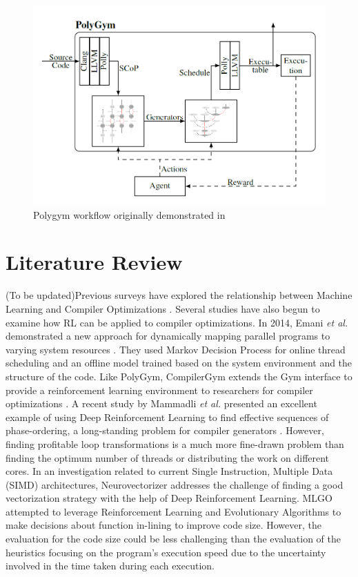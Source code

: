 \documentclass[logo,msc]{infthesis}           %
\begin{document}
\begin{figure}[htbp]
  \centering
  \includegraphics[width=\textwidth]{Images/PolyGym.png}    
  \caption{Polygym workflow originally demonstrated in \cite{P1}}
  \label{fig:polygym}
\end{figure}

\section{Literature Review}

(To be updated)Previous surveys have explored the relationship between Machine Learning and Compiler Optimizations \cite{8357388}\cite{9232934}. Several studies have also begun to examine how RL can be applied to compiler optimizations. In 2014, Emani \textit{et al.} demonstrated a new approach for dynamically mapping parallel programs to varying system resources \cite{10.1007}. They used Markov Decision Process for online thread scheduling and an offline model trained based on the system environment and the structure of the code. Like PolyGym, CompilerGym extends the Gym interface to provide a reinforcement learning environment to researchers for compiler optimizations \cite{CompilerGym}. A recent study by Mammadli \textit{et al.} presented an excellent example of using Deep Reinforcement Learning to find effective sequences of phase-ordering, a long-standing problem for compiler generators \cite{static.neural}. However, finding profitable loop transformations is a much more fine-drawn problem than finding the optimum number of threads or distributing the work on different cores. In an investigation related to current Single Instruction, Multiple Data (SIMD) architectures, Neurovectorizer \cite{NeuroVectorizer} addresses the challenge of finding a good vectorization strategy with the help of Deep Reinforcement Learning. MLGO \cite{10.48550} attempted to leverage Reinforcement Learning and Evolutionary Algorithms to make decisions about function in-lining to improve code size. However, the evaluation for the code size could be less challenging than the evaluation of the heuristics focusing on the program's execution speed due to the uncertainty involved in the time taken during each execution.
\end{document}
